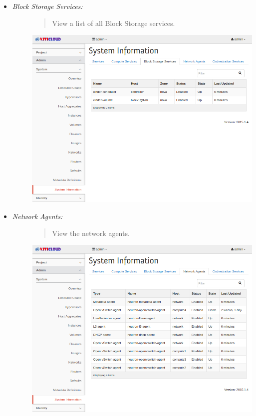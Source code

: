\documentclass[letterpaper,10pt,english]{sphinxmanual}
\begin{document}
\begin{description}
\begin{itemize}
\begin{description}
\end{description}

\item {} \begin{description}
\item[{\emph{Block Storage Services:}}] \leavevmode\begin{quote}

View a list of all Block Storage services.
\end{quote}

\includegraphics{sys_block_storage_services.png}

\end{description}

\item {} \begin{description}
\item[{\emph{Network Agents:}}] \leavevmode\begin{quote}

View the network agents.
\end{quote}

\includegraphics{sys_network_agents.png}


\end{description}
\end{itemize}
\end{description}
\end{document}
